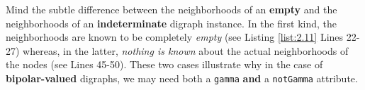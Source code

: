 Mind the subtle difference between the neighborhoods of an \textbf{empty} and the neighborhoods of an \textbf{indeterminate} digraph instance. In the first kind, the neighborhoods are known to be completely \emph{empty}  (see Listing \ref{list:2.11} Lines 22-27) whereas, in the latter, \emph{nothing is known} about the actual neighborhoods of the nodes  (see Lines 45-50). These two cases illustrate why in the case of \textbf{bipolar-valued} digraphs, we may need both a \texttt{gamma} \textbf{and} a \texttt{notGamma} attribute.

\clearpage
{}

\typeout{}

%